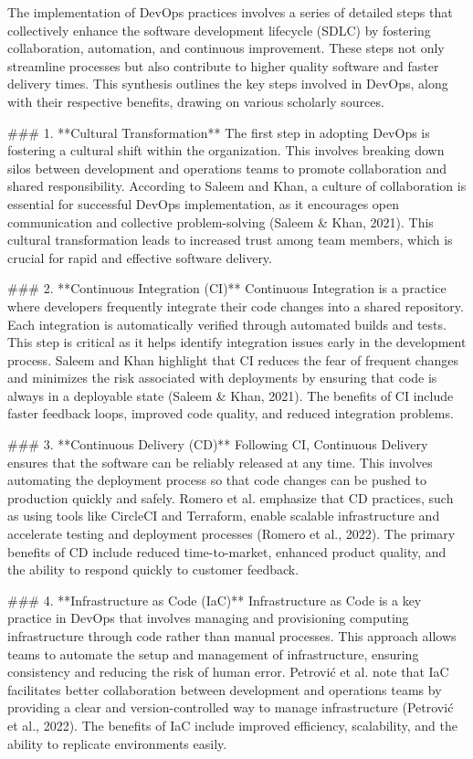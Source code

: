 The implementation of DevOps practices involves a series of detailed steps that collectively enhance the software development lifecycle (SDLC) by fostering collaboration, automation, and continuous improvement. These steps not only streamline processes but also contribute to higher quality software and faster delivery times. This synthesis outlines the key steps involved in DevOps, along with their respective benefits, drawing on various scholarly sources.

### 1. **Cultural Transformation**
The first step in adopting DevOps is fostering a cultural shift within the organization. This involves breaking down silos between development and operations teams to promote collaboration and shared responsibility. According to Saleem and Khan, a culture of collaboration is essential for successful DevOps implementation, as it encourages open communication and collective problem-solving (Saleem & Khan, 2021). This cultural transformation leads to increased trust among team members, which is crucial for rapid and effective software delivery.

### 2. **Continuous Integration (CI)**
Continuous Integration is a practice where developers frequently integrate their code changes into a shared repository. Each integration is automatically verified through automated builds and tests. This step is critical as it helps identify integration issues early in the development process. Saleem and Khan highlight that CI reduces the fear of frequent changes and minimizes the risk associated with deployments by ensuring that code is always in a deployable state (Saleem & Khan, 2021). The benefits of CI include faster feedback loops, improved code quality, and reduced integration problems.

### 3. **Continuous Delivery (CD)**
Following CI, Continuous Delivery ensures that the software can be reliably released at any time. This involves automating the deployment process so that code changes can be pushed to production quickly and safely. Romero et al. emphasize that CD practices, such as using tools like CircleCI and Terraform, enable scalable infrastructure and accelerate testing and deployment processes (Romero et al., 2022). The primary benefits of CD include reduced time-to-market, enhanced product quality, and the ability to respond quickly to customer feedback.

### 4. **Infrastructure as Code (IaC)**
Infrastructure as Code is a key practice in DevOps that involves managing and provisioning computing infrastructure through code rather than manual processes. This approach allows teams to automate the setup and management of infrastructure, ensuring consistency and reducing the risk of human error. Petrović et al. note that IaC facilitates better collaboration between development and operations teams by providing a clear and version-controlled way to manage infrastructure (Petrović et al., 2022). The benefits of IaC include improved efficiency, scalability, and the ability to replicate environments easily.

